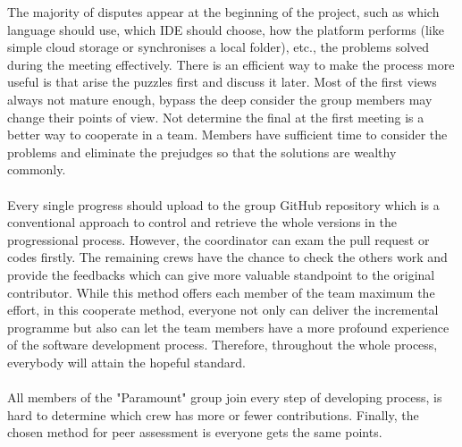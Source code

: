 \documentclass{article}
\begin{document}
	The majority of disputes appear at the beginning of the project, such as which language should use, which IDE should choose, how the platform performs (like simple cloud storage or synchronises a local folder), etc., the problems solved during the meeting effectively. There is an efficient way to make the process more useful is that arise the puzzles first and discuss it later. Most of the first views always not mature enough, bypass the deep consider the group members may change their points of view. Not determine the final at the first meeting is a better way to cooperate in a team. Members have sufficient time to consider the problems and eliminate the prejudges so that the solutions are wealthy commonly.
	\\ \hspace*{\fill} \\
	Every single progress should upload to the group GitHub repository which is a conventional approach to control and retrieve the whole versions in the progressional process. However, the coordinator can exam the pull request or codes firstly. The remaining crews have the chance to check the others work and provide the feedbacks which can give more valuable standpoint to the original contributor. While this method offers each member of the team maximum the effort, in this cooperate method, everyone not only can deliver the incremental programme but also can let the team members have a more profound experience of the software development process. Therefore, throughout the whole process, everybody will attain the hopeful standard.
	\\ \hspace*{\fill} \\
	All members of the "Paramount" group join every step of developing process, is hard to determine which crew has more or fewer contributions. Finally, the chosen method for peer assessment is everyone gets the same points.
\end{document}
